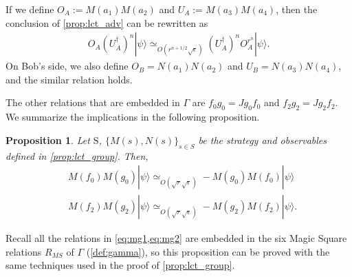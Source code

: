 \documentclass[11pt,letterpaper]{article}
\newcommand{\ket}[1]{|#1\rangle}
\newcommand{\ct}{^{\dagger}}
\newcommand{\1}{\mathbb{1}}
\newcommand{\bS}{\mathrm{S}}
\newcommand{\se}{\sqrt{\epsilon}}
\newcommand{\sr}{\sqrt{r}}
\newcommand{\appd}[1]{\simeq_{#1}}
\newtheorem{proposition}[theorem]{Proposition}
\theoremstyle{definition}
\begin{document}
If we define $O_A := M(a_1)M(a_2)$ and $U_A := M(a_3)M(a_4)$, then
the conclusion of \cref{prop:lct_adv} can be rewritten as 
\begin{align*}
	 O_A (U_A\ct)^n \ket{\psi} \appd{O(r^{n+1/2} \se)} (U_A\ct)^n O_A^{r^n} \ket{\psi}.
\end{align*}
On Bob's side, we also define $O_B = N(a_1)N(a_2)$ and $U_B = N(a_3)N(a_4)$, 
and the similar relation holds.

The other relations that are embedded in $\Gamma$ are 
$f_0g_0 = Jg_0f_0$ and $f_2g_2 = Jg_2 f_2$.
We summarize the implications in the following proposition.
\begin{proposition}
	\label{prop:lct_comm}
	Let $\bS$, $\{M(s), N(s)\}_{s \in S}$ be the strategy and observables defined in \cref{prop:lct_group}.
	Then,
	\begin{align}
		&M(f_0)M(g_0) \ket{\psi} \appd{O(\sr \se)} -M(g_0)M(f_0) \ket{\psi} \\
		&M(f_2)M(g_2) \ket{\psi} \appd{O(\sr \se)} -M(g_2)M(f_2) \ket{\psi}.
	\end{align}
\end{proposition}
Recall all the relations in \cref{eq:mg1,eq:mg2} are embedded in the
six Magic Square relations $R_{MS}$ of $\Gamma$ (\cref{def:gamma}), 
so this proposition can be proved with the same techniques used in the proof of \cref{prop:lct_group}.
\end{document}
